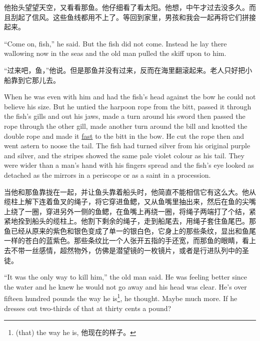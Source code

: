 \begin{paracol}{2}
\switchcolumn

他抬头望望天空，又看看那鱼。他仔细看了看太阳。他想，中午才过去没多久。而且刮起了信风。这些鱼线都用不上了。等回到家里，男孩和我会一起再将它们拼接起来。

\switchcolumn*

``Come on, fish,'' he said. But the fish did not come. Instead he lay there
\gls{wallowing} now in the seas and the old man pulled the skiff \gls{upon} to
him.

\switchcolumn

“过来吧，鱼，”他说。但是那鱼并没有过来，反而在海里翻滚起来。老人只好把小船靠到它那儿去。

\switchcolumn*

When he was even with him and had the fish's head against the bow he could
not believe his size. But he \gls{untied} the harpoon rope from the bitt,
passed it through the fish's gills and out his jaws, made a turn around his
\gls{sword} then passed the rope through the other gill, made another turn
around the bill and knotted the double rope and made it \uline{fast} to the bitt in
the bow. He cut the rope then and went astern to noose the tail. The fish
had turned silver from his \gls{original} purple and silver, and the stripes
showed the same pale \gls{violet} colour as his tail. They were wider than a
man's hand with his fingers spread and the fish's eye looked as
\gls{detached} as the mirrors in a \gls{periscope} or as a \gls{saint} in a
\gls{procession}.

\switchcolumn

当他和那鱼靠拢在一起，并让鱼头靠着船头时，他简直不能相信它有这么大。他从缆柱上解下连着鱼叉的绳子，将它穿进鱼鳃，又从鱼嘴里抽出来，然后在鱼的尖嘴上绕了一圈，穿进另外一侧的鱼鳃，在鱼嘴上再绕一圈，将绳子两端打了个结，紧紧地拴到船头的缆柱上。他割下剩余的绳子，走到船尾去，用绳子套住鱼尾巴。那鱼已经从原来的紫色和银色变成了单一的银白色，它身上的那些条纹，显出和鱼尾一样的苍白的蓝紫色。那些条纹比一个人张开五指的手还宽，而那鱼的眼睛，看上去不带一丝感情，超然物外，仿佛是潜望镜的一枚镜片，或者是行进队列中的圣徒。

\switchcolumn*

``It was the only way to kill him,'' the old man said. He was feeling better
since the water and he knew he would not go away and his head was clear.
He's over fifteen hundred pounds the way he is\footnote{(that) the way he
  is, 他现在的样子。}, he thought. Maybe much more. If he dresses out
two-thirds of that at thirty cents a pound?

\switchcolumn


\end{paracol}
